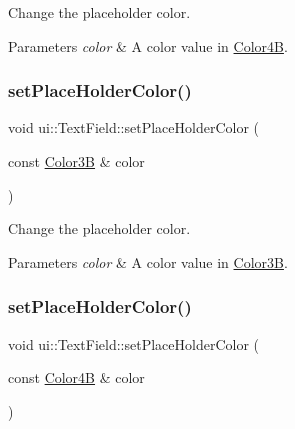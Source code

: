 Change the placeholder color. 


\begin{DoxyParams}{Parameters}
{\em color} & A color value in {\ttfamily \hyperlink{structColor4B}{Color4B}}. \\
\hline
\end{DoxyParams}
\mbox{\label{classui_1_1TextField_a64bf3054d1aa45eeea0dd3b01b953c50}} 
\subsubsection{\texorpdfstring{set\+Place\+Holder\+Color()}{setPlaceHolderColor()}\hspace{0.1cm}{\footnotesize\ttfamily [3/4]}}
{\footnotesize\ttfamily void ui\+::\+Text\+Field\+::set\+Place\+Holder\+Color (\begin{DoxyParamCaption}\item[{const \hyperlink{structColor3B}{Color3B} \&}]{color }\end{DoxyParamCaption})}



Change the placeholder color. 


\begin{DoxyParams}{Parameters}
{\em color} & A color value in {\ttfamily \hyperlink{structColor3B}{Color3B}}. \\
\hline
\end{DoxyParams}
\mbox{\label{classui_1_1TextField_acfd23c7de3ad8725aedac1f770230283}} 
\subsubsection{\texorpdfstring{set\+Place\+Holder\+Color()}{setPlaceHolderColor()}\hspace{0.1cm}{\footnotesize\ttfamily [4/4]}}
{\footnotesize\ttfamily void ui\+::\+Text\+Field\+::set\+Place\+Holder\+Color (\begin{DoxyParamCaption}\item[{const \hyperlink{structColor4B}{Color4B} \&}]{color }\end{DoxyParamCaption})}




